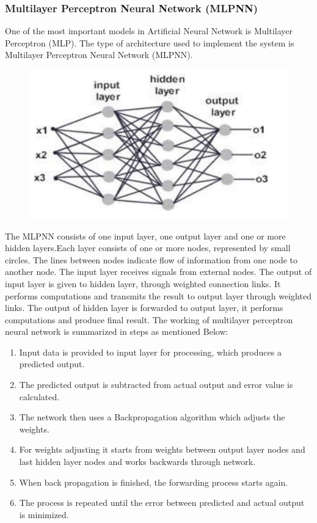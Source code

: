 \documentclass{book}
\begin{document}
  		\subsubsection{Multilayer Perceptron Neural Network (MLPNN)}
  		One of the most important models in Artificial Neural Network is Multilayer Perceptron
  		(MLP). The  type of architecture  used to  implement  the system  is Multilayer Perceptron Neural Network (MLPNN).
  		\begin{figure}[H]
  			\begin{center}
  				\includegraphics[width=12cm]{images/mlpnn.png}
  			\end{center}
  		\end{figure}
  		The MLPNN consists of one input layer, one output layer and one or more hidden layers.Each layer consists of one or more nodes, represented by small circles. The lines between nodes indicate flow of information from one node to another node. The input layer receives signals from external nodes. The output of input layer is given to hidden layer, through weighted connection links. It performs computations and transmits the result to output layer through weighted links. The output of hidden layer is forwarded to output layer, it performs computations and produce final result. The working of multilayer perceptron neural network is summarized in steps as mentioned
  		Below:
  		\begin{enumerate}
  			\item Input data  is provided to input layer for processing, which  produces a
  			predicted output.
  			\item The predicted output is subtracted from actual output and error value is
  			calculated.
  			\item  The network then  uses a  Backpropagation algorithm  which  adjusts the
  			weights.
  			\item For weights adjusting it starts from weights between output layer nodes
  			and last hidden layer nodes and works backwards through network.
  			\item When back propagation is finished, the forwarding process starts again.
  			\item The process is repeated until the error between predicted and actual output
  			is minimized.
  		\end{enumerate}
  	\pagebreak
  	
\end{document}
